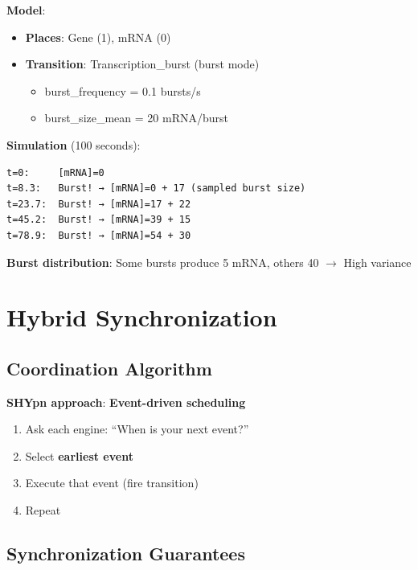 \textbf{Model}:

\begin{itemize}
    \item \textbf{Places}: Gene (1), mRNA (0)
    \item \textbf{Transition}: Transcription\_burst (burst mode)
    \begin{itemize}
        \item burst\_frequency = 0.1 bursts/s
        \item burst\_size\_mean = 20 mRNA/burst
    \end{itemize}
\end{itemize}

\textbf{Simulation} (100 seconds):

\begin{verbatim}
t=0:     [mRNA]=0
t=8.3:   Burst! → [mRNA]=0 + 17 (sampled burst size)
t=23.7:  Burst! → [mRNA]=17 + 22
t=45.2:  Burst! → [mRNA]=39 + 15
t=78.9:  Burst! → [mRNA]=54 + 30
\end{verbatim}

\textbf{Burst distribution}: Some bursts produce 5 mRNA, others 40 $\to$ High variance

\section{Hybrid Synchronization}
\label{sec:hybrid-synchronization}

\subsection{Coordination Algorithm}
\label{subsec:coordination-algorithm}

\textbf{SHYpn approach}: \textbf{Event-driven scheduling}

\begin{enumerate}
    \item Ask each engine: ``When is your next event?''
    \item Select \textbf{earliest event}
    \item Execute that event (fire transition)
    \item Repeat
\end{enumerate}

\subsection{Synchronization Guarantees}
\label{subsec:synchronization-guarantees}

